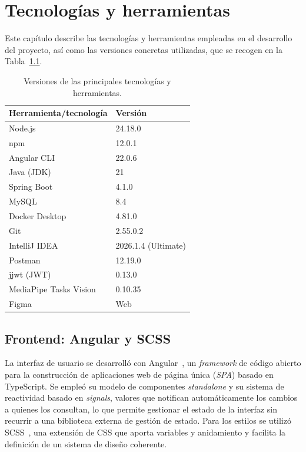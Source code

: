 \documentclass[12pt,a4paper,twoside,openright]{book}
\begin{document}
    \chapter{Tecnologías y herramientas}
    \label{cap:tecnologias}
    
    Este capítulo describe las tecnologías y herramientas empleadas en el
    desarrollo del proyecto, así como las versiones concretas utilizadas, que se
    recogen en la Tabla~\ref{tab:versiones}.
    
    \begin{table}[htbp]
        \centering
        \begin{tabular}{ll}
            \toprule
            \textbf{Herramienta/tecnología} & \textbf{Versión} \\
            \midrule
            Node.js        & 24.18.0 \\
            npm            & 12.0.1 \\
            Angular CLI    & 22.0.6 \\
            Java (JDK)     & 21 \\
            Spring Boot    & 4.1.0 \\
            MySQL          & 8.4 \\
            Docker Desktop & 4.81.0 \\
            Git            & 2.55.0.2 \\
            IntelliJ IDEA  & 2026.1.4 (Ultimate) \\
            Postman        & 12.19.0 \\
            jjwt (JWT)     & 0.13.0 \\
            MediaPipe Tasks Vision & 0.10.35 \\
            Figma          & Web \\
            \bottomrule
        \end{tabular}
        \caption{Versiones de las principales tecnologías y herramientas.}
        \label{tab:versiones}
    \end{table}
    
    \section{Frontend: Angular y SCSS}

    La interfaz de usuario se desarrolló con Angular~\cite{angular}, un
    \textit{framework} de código abierto para la construcción de aplicaciones
    web de página única (\textit{SPA}) basado en TypeScript. Se empleó su modelo
    de componentes \textit{standalone} y su sistema de reactividad basado en
    \textit{signals}, valores que notifican automáticamente los cambios a quienes
    los consultan, lo que permite gestionar el estado de la interfaz sin recurrir
    a una biblioteca externa de gestión de estado. Para los estilos se utilizó
    SCSS~\cite{scss}, una extensión de CSS que aporta variables y anidamiento y
    facilita la definición de un sistema de diseño coherente.
    
\end{document}
